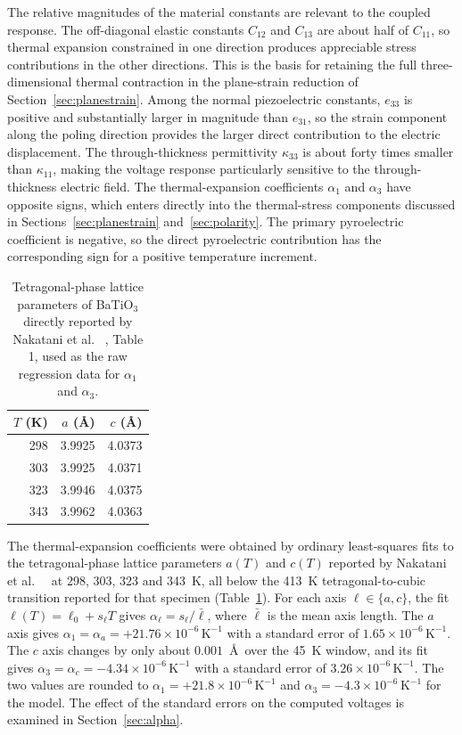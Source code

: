 \documentclass[pdflatex,sn-mathphys-num]{sn-jnl}
\begin{document}
The relative magnitudes of the material constants are relevant to the coupled response.
The off-diagonal elastic constants $C_{12}$ and $C_{13}$ are about half of $C_{11}$,
so thermal expansion constrained in one direction produces appreciable stress
contributions in the other directions. This is the basis for retaining the full
three-dimensional thermal contraction in the plane-strain reduction of
Section~\ref{sec:planestrain}. Among the normal piezoelectric constants, $e_{33}$ is
positive and substantially larger in magnitude than $e_{31}$, so the strain component
along the poling direction provides the larger direct contribution to the electric
displacement. The through-thickness permittivity $\kappa_{33}$ is about forty times
smaller than $\kappa_{11}$, making the voltage response particularly sensitive to the
through-thickness electric field. The thermal-expansion coefficients $\alpha_1$ and
$\alpha_3$ have opposite signs, which enters directly into the thermal-stress
components discussed in Sections~\ref{sec:planestrain} and~\ref{sec:polarity}. The
primary pyroelectric coefficient is negative, so the direct pyroelectric contribution
has the corresponding sign for a positive temperature increment.

\begin{table}[t]
\centering
\caption{Tetragonal-phase lattice parameters of BaTiO$_3$ directly reported by
Nakatani et al. ~\cite{Nakatani2016}, Table 1, used as the raw regression data for
$\alpha_1$ and $\alpha_3$.}
\label{tab:nakatani-raw}
\begin{tabular}{@{}rrr@{}}
\toprule
$T$ (K) & $a$ (\AA) & $c$ (\AA) \\
\midrule
298 & 3.9925 & 4.0373 \\
303 & 3.9925 & 4.0371 \\
323 & 3.9946 & 4.0375 \\
343 & 3.9962 & 4.0363 \\
\bottomrule
\end{tabular}
\end{table}

The thermal-expansion coefficients were obtained by ordinary least-squares fits to the
tetragonal-phase lattice parameters $a(T)$ and $c(T)$ reported by Nakatani et al.\
~\cite{Nakatani2016} at 298, 303, 323 and 343~K, all below the 413~K
tetragonal-to-cubic transition reported for that specimen
(Table~\ref{tab:nakatani-raw}). For each axis $\ell\in\{a,c\}$, the fit
$\ell(T)=\ell_0+s_\ell T$ gives $\alpha_\ell=s_\ell/\bar\ell$, where $\bar\ell$ is the
mean axis length. The $a$ axis gives
$\alpha_1=\alpha_a=+21.76\times10^{-6}\,\text{K}^{-1}$ with a standard error of
$1.65\times10^{-6}\,\text{K}^{-1}$. The $c$ axis changes by only about $0.001$~\AA\
over the 45~K window, and its fit gives
$\alpha_3=\alpha_c=-4.34\times10^{-6}\,\text{K}^{-1}$ with a standard error of
$3.26\times10^{-6}\,\text{K}^{-1}$. The two values are rounded to
$\alpha_1=+21.8\times10^{-6}\,\text{K}^{-1}$ and
$\alpha_3=-4.3\times10^{-6}\,\text{K}^{-1}$ for the model. The effect of the standard
errors on the computed voltages is examined in Section~\ref{sec:alpha}.
\end{document}

